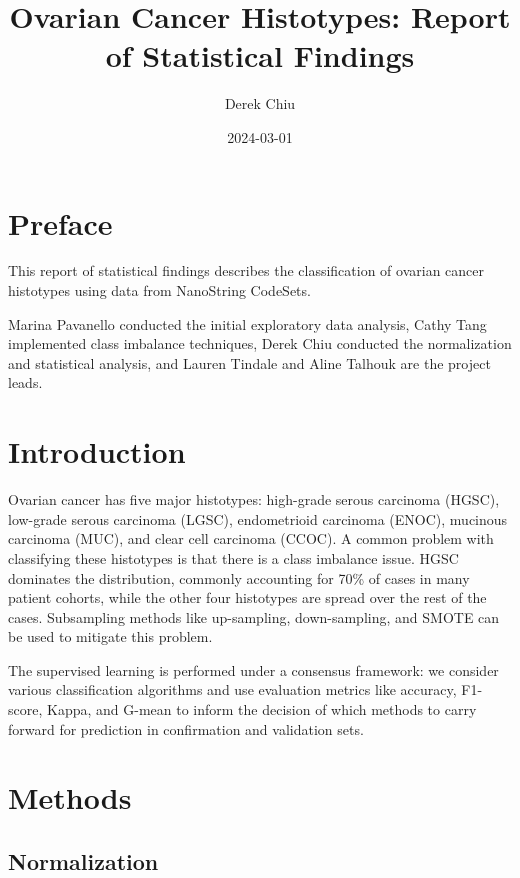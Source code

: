 \documentclass[
]{report}
\title{Ovarian Cancer Histotypes: Report of Statistical Findings}
\author{Derek Chiu}
\date{2024-03-01}
\begin{document}
\maketitle

{
\hypersetup{linkcolor=}
\setcounter{tocdepth}{1}
\tableofcontents
}
\listoffigures
\listoftables
\hypertarget{preface}{%
\chapter*{Preface}\label{preface}}

This report of statistical findings describes the classification of ovarian cancer histotypes using data from NanoString CodeSets.

Marina Pavanello conducted the initial exploratory data analysis, Cathy Tang implemented class imbalance techniques, Derek Chiu conducted the normalization and statistical analysis, and Lauren Tindale and Aline Talhouk are the project leads.

\hypertarget{introduction}{%
\chapter{Introduction}\label{introduction}}

Ovarian cancer has five major histotypes: high-grade serous carcinoma (HGSC), low-grade serous carcinoma (LGSC), endometrioid carcinoma (ENOC), mucinous carcinoma (MUC), and clear cell carcinoma (CCOC). A common problem with classifying these histotypes is that there is a class imbalance issue. HGSC dominates the distribution, commonly accounting for 70\% of cases in many patient cohorts, while the other four histotypes are spread over the rest of the cases. Subsampling methods like up-sampling, down-sampling, and SMOTE can be used to mitigate this problem.

The supervised learning is performed under a consensus framework: we consider various classification algorithms and use evaluation metrics like accuracy, F1-score, Kappa, and G-mean to inform the decision of which methods to carry forward for prediction in confirmation and validation sets.

\hypertarget{methods}{%
\chapter{Methods}\label{methods}}

\hypertarget{normalization}{%
\section{Normalization}\label{normalization}}
\end{document}

